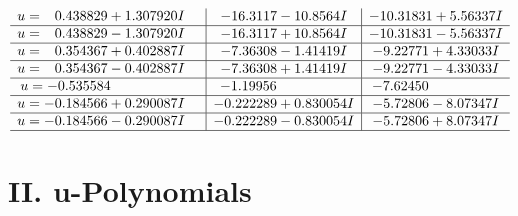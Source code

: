\documentclass[1p]{elsarticle_modified}
\theoremstyle{definition}
\begin{document}
$$\begin{array}{c|c|c}
\begin{aligned}
u &= \phantom{-}0.438829 + 1.307920 I\end{aligned}
 & -16.3117 - 10.8564 I & -10.31831 + 5.56337 I \\ \hline\begin{aligned}
u &= \phantom{-}0.438829 - 1.307920 I\end{aligned}
 & -16.3117 + 10.8564 I & -10.31831 - 5.56337 I \\ \hline\begin{aligned}
u &= \phantom{-}0.354367 + 0.402887 I\end{aligned}
 & -7.36308 - 1.41419 I & -9.22771 + 4.33033 I \\ \hline\begin{aligned}
u &= \phantom{-}0.354367 - 0.402887 I\end{aligned}
 & -7.36308 + 1.41419 I & -9.22771 - 4.33033 I \\ \hline\begin{aligned}
u &= -0.535584\phantom{ +0.000000I}\end{aligned}
 & -1.19956\phantom{ +0.000000I} & -7.62450\phantom{ +0.000000I} \\ \hline\begin{aligned}
u &= -0.184566 + 0.290087 I\end{aligned}
 & -0.222289 + 0.830054 I & -5.72806 - 8.07347 I \\ \hline\begin{aligned}
u &= -0.184566 - 0.290087 I\end{aligned}
 & -0.222289 - 0.830054 I & -5.72806 + 8.07347 I\\
 \hline 
 \end{array}$$\newpage
\newpage\renewcommand{\arraystretch}{1}
\centering \section*{ II. u-Polynomials}
\end{document}

